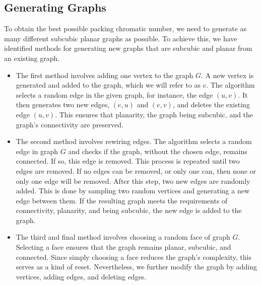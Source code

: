 \documentclass[12pt,a4paper]{amsart}
\theoremstyle{definition}
\theoremstyle{plain}
\begin{document}
\subsection{Generating Graphs}
To obtain the best possible packing chromatic number, we need to generate as many different subcubic planar graphs as possible.  
To achieve this, we have identified methods for generating new graphs that are subcubic and planar from an existing graph.
\vspace{5pt}  
\begin{itemize}
    \item The first method involves adding one vertex to the graph $G$. A new vertex is generated and added to the graph, 
    which we will refer to as $e$. The algorithm selects a random edge in the given graph, for instance, the edge $(u, v)$. 
    It then generates two new edges, $(e, u)$ and $(e, v)$, and deletes the existing edge $(u, v)$. This ensures that planarity, 
    the graph being subcubic, and the graph's connectivity are preserved.  
    \vspace{5pt}
    \item The second method involves rewiring edges. The algorithm selects a random edge in graph $G$ and checks if the graph, 
    without the chosen edge, remains connected. If so, this edge is removed. This process is repeated until two edges are removed. 
    If no edges can be removed, or only one can, then none or only one edge will be removed. After this step, two new edges are randomly 
    added. This is done by sampling two random vertices and generating a new edge between them. If the resulting graph meets the requirements 
    of connectivity, planarity, and being subcubic, the new edge is added to the graph.
    \vspace{5pt}  
    \item The third and final method involves choosing a random face of graph $G$. Selecting a face ensures that the graph remains planar, 
    subcubic, and connected. Since simply choosing a face reduces the graph's complexity, this serves as a kind of reset. Nevertheless, 
    we further modify the graph by adding vertices, adding edges, and deleting edges.
    \vspace{5pt}  
\end{itemize}
\end{document}

